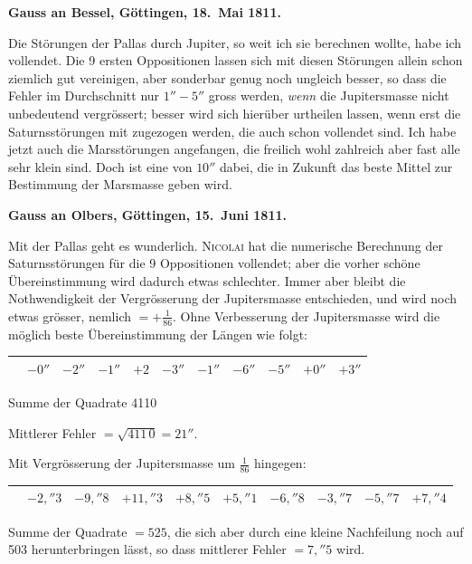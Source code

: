 \documentclass[12pt,a4paper]{article}
\begin{document}
\newpage
\setcounter{page}{434}
%
\medskip\noindent
\textbf{Gauss an Bessel, Göttingen, 18.~Mai 1811.}

Die Störungen der Pallas durch Jupiter, so weit ich sie berechnen wollte, habe ich vollendet. Die 9 ersten Oppositionen lassen sich mit diesen Störungen allein schon ziemlich gut vereinigen, aber sonderbar genug noch ungleich besser, so dass die Fehler im Durchschnitt nur $1''-5''$ gross werden, \textit{wenn} die Jupitersmasse nicht unbedeutend vergrössert; besser wird sich hierüber urtheilen lassen, wenn erst die Saturnsstörungen mit zugezogen werden, die auch schon vollendet sind. Ich habe jetzt auch die Marsstörungen angefangen, die freilich wohl zahlreich aber fast alle sehr klein sind. Doch ist eine von $10''$ dabei, die in Zukunft das beste Mittel zur Bestimmung der Marsmasse geben wird.

\medskip\noindent
\textbf{Gauss an Olbers, Göttingen, 15.~Juni 1811.}

Mit der Pallas geht es wunderlich. \textsc{Nicolai} hat die numerische Berechnung der Saturnsstörungen für die 9 Oppositionen vollendet; aber die vorher schöne Übereinstimmung wird dadurch etwas schlechter. Immer aber bleibt die Nothwendigkeit der Vergrösserung der Jupitersmasse entschieden, und wird noch etwas grösser, nemlich $= +\frac{1}{86}$. Ohne Verbesserung der Jupitersmasse wird die möglich beste Übereinstimmung der Längen wie folgt:
\begin{center}
\begin{tabular}{l@{\quad}r@{\quad}r@{\quad}r@{\quad}r@{\quad}r@{\quad}r@{\quad}r@{\quad}r@{\quad}r}
\toprule
& $-0''$ & $-2''$ & $-1''$ & $+2$ & $-3''$ & $-1''$ & $-6''$ & $-5''$ & $+0''$ & $+3''$ \\
\bottomrule
\end{tabular}
\end{center}
Summe der Quadrate 4110

Mittlerer Fehler $= \sqrt{411\,0} = 21''$.

Mit Vergrösserung der Jupitersmasse um $\frac{1}{86}$ hingegen:
\begin{center}
\begin{tabular}{l@{\quad}r@{\quad}r@{\quad}r@{\quad}r@{\quad}r@{\quad}r@{\quad}r@{\quad}r@{\quad}r}
\toprule
& $-2{,}''3$ & $-9{,}''8$ & $+11{,}''3$ & $+8{,}''5$ & $+5{,}''1$ & $-6{,}''8$ & $-3{,}''7$ & $-5{,}''7$ & $+7{,}''4$ \\
\bottomrule
\end{tabular}
\end{center}
Summe der Quadrate $= 525$, die sich aber durch eine kleine Nachfeilung noch auf 503 herunterbringen lässt, so dass mittlerer Fehler $= 7{,}''5$ wird.
\end{document}
